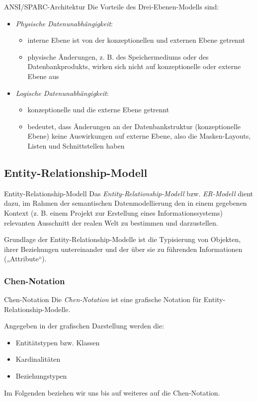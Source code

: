 \begin{defi}{ANSI/SPARC-Architektur}
    Die Vorteile des Drei-Ebenen-Modells sind:
    \begin{itemize}
        \item \emph{Physische Datenunabhängigkeit}:
              \begin{itemize}
                  \item interne Ebene ist von der konzeptionellen und externen Ebene getrennt
                  \item physische Änderungen, z. B. des Speichermediums oder des Datenbankprodukts, wirken sich nicht auf konzeptionelle oder externe Ebene aus
              \end{itemize}
        \item \emph{Logische Datenunabhängigkeit}:
              \begin{itemize}
                  \item konzeptionelle und die externe Ebene getrennt
                  \item bedeutet, dass Änderungen an der Datenbankstruktur (konzeptionelle Ebene) keine Auswirkungen auf externe Ebene, also die Masken-Layouts, Listen und Schnittstellen haben
              \end{itemize}
    \end{itemize}
\end{defi}

\subsection{Entity-Relationship-Modell}

\begin{defi}{Entity-Relationship-Modell}
    Das \emph{Entity-Relationship-Modell} bzw. \emph{ER-Modell} dient dazu, im Rahmen der semantischen Datenmodellierung den in einem gegebenen Kontext (z. B. einem Projekt zur Erstellung eines Informationssystems) relevanten Ausschnitt der realen Welt zu bestimmen und darzustellen.

    Grundlage der Entity-Relationship-Modelle ist die Typisierung von Objekten, ihrer Beziehungen untereinander und der über sie zu führenden Informationen („Attribute“).
\end{defi}

\subsubsection{Chen-Notation}

\begin{defi}{Chen-Notation}
    Die \emph{Chen-Notation} ist eine grafische Notation für Entity-Relationship-Modelle.

    Angegeben in der grafischen Darstellung werden die:
    \begin{itemize}
        \item Entitätstypen bzw. Klassen
        \item Kardinalitäten
        \item Beziehungstypen
    \end{itemize}

    Im Folgenden beziehen wir uns bis auf weiteres auf die Chen-Notation.
\end{defi}

